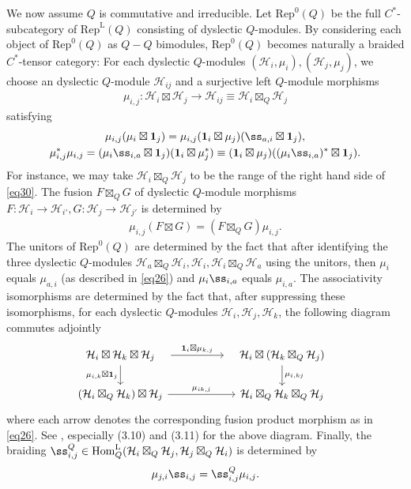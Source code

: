 \documentclass[11pt,b5paper,notitlepage]{article}
\theoremstyle{definition}
\theoremstyle{plain}
\newcommand{\mc}{\mathcal}
\newcommand{\id}{\mathbf{1}}
\newcommand{\Rep}{\mathrm{Rep}}
\newcommand{\RepL}{\mathrm{Rep}^{\mathrm{L}}}
\newcommand{\HomL}{\mathrm{Hom}^{\mathrm{L}}}
\numberwithin{equation}{section}
\begin{document}
We now assume $Q$ is commutative and irreducible. Let $\Rep^0(Q)$ be the full $C^*$-subcategory of $\RepL(Q)$ consisting of  dyslectic $Q$-modules. By considering each object of $\Rep^0(Q)$ as $Q-Q$ bimodules, $\Rep^0(Q)$ becomes naturally a braided $C^*$-tensor category: For each dyslectic $Q$-modules $(\mc H_i,\mu_i),(\mc H_j,\mu_j)$, we choose an dyslectic $Q$-module $\mc H_{ij}$ and a surjective left $Q$-module morphisms 
\begin{align}
\mu_{i,j}: \mc H_i\boxtimes\mc H_j\rightarrow \mc H_{ij}\equiv\mc H_i\boxtimes_Q\mc H_j	\label{eq26}
\end{align}
satisfying 
\begin{gather}
\mu_{i,j}(\mu_i\boxtimes\id_j)=\mu_{i,j}(\id_i\boxtimes\mu_j)(\ss_{a,i}\boxtimes\id_j),\label{eq29}\\
\mu_{i,j}^*\mu_{i,j}=(\mu_i\ss_{i,a}\boxtimes\id_j)(\id_i\boxtimes\mu_j^*)\equiv(\id_i\boxtimes\mu_j)((\mu_i\ss_{i,a})^*\boxtimes\id_j).\label{eq30}
\end{gather}
For instance, we may  take $\mc H_i\boxtimes_Q\mc H_j$ to be the range of the right hand side of \eqref{eq30}. The fusion $F\boxtimes_Q G$ of dyslectic $Q$-module morphisms  $F:\mc H_i\rightarrow\mc H_{i'},G:\mc H_j\rightarrow\mc H_{j'}$ is determined by
\begin{align}
\mu_{i,j}(F\boxtimes G)=(F\boxtimes_Q G)\mu_{i,j}.	
\end{align}
The unitors of $\Rep^0(Q)$ are determined by the fact that after identifying the three dyslectic $Q$-modules $\mc H_a\boxtimes_Q \mc H_i,\mc H_i,\mc H_i\boxtimes_Q\mc H_a$ using the unitors, then $\mu_i$ equals $\mu_{a,i}$ (as described in \eqref{eq26}) and $\mu_i\ss_{i,a}$ equals $\mu_{i,a}$. The associativity isomorphisms are determined by the fact that, after suppressing these isomorphisms, for each dyslectic $Q$-modules $\mc H_i,\mc H_j,\mc H_k$, the following diagram commutes adjointly
\begin{equation}
	\begin{tikzcd}
		\quad \mc H_i\boxtimes\mc H_k\boxtimes\mc H_j\quad \arrow[rr,"{\id_i\boxtimes\mu_{k,j}}"] \arrow[d, "{\mu_{i,k}\boxtimes\id_j}"'] &&\quad \mc H_i\boxtimes(\mc H_k\boxtimes_Q\mc H_j)\quad \arrow[d, "{\mu_{i,kj}}"]\\
		(\mc H_i\boxtimes_Q\mc H_k)\boxtimes\mc H_j\arrow[rr,"{\mu_{ik,j}}"] &&\mc H_i\boxtimes_Q\mc H_k\boxtimes_Q\mc H_j
	\end{tikzcd}
\end{equation}
where each arrow denotes the corresponding fusion product morphism as in \eqref{eq26}. See \cite[Sec. 3.2, 3.4]{Gui19}, especially (3.10) and (3.11) for the above diagram. Finally, the braiding $\ss_{i,j}^Q\in\HomL_Q(\mc H_i\boxtimes_Q\mc H_j,\mc H_j\boxtimes_Q\mc H_i)$ is determined by
\begin{align}
\mu_{j,i}\ss_{i,j}=\ss^Q_{i,j}\mu_{i,j}.	
\end{align} 
\end{document}
